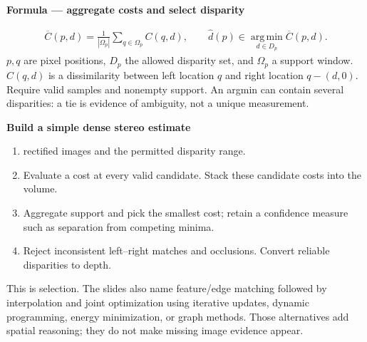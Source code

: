 \documentclass[letterpaper,11pt,english,openany,oneside]{jupyterBook}
\begin{document}
\ignorespaces
{}\ignorespaces
{}\ignorespaces
\begin{TextbookBox}
\textbf{Formula — aggregate costs and select disparity}\par\smallskip
\begin{equation}\label{equation:lectures/lecture04/matching:eq-lec04-cost-volume}
\begin{split}\overline C(p,d)=\frac1{|\Omega_p|}\sum_{q\in\Omega_p}C(q,d),
\qquad \widehat d(p)\in\operatorname*{arg\,min}_{d\in D_p}\overline C(p,d).\end{split}
\end{equation}
\sphinxAtStartPar
\(p,q\) are pixel positions, \(D_p\) the allowed disparity set, and \(\Omega_p\) a support window. \(C(q,d)\) is a dissimilarity between left location \(q\) and right location \(q-(d,0)\). Require valid samples and nonempty support. An argmin can contain several disparities: a tie is evidence of ambiguity, not a unique measurement.

\end{TextbookBox}

\begin{TextbookBox}
\textbf{Build a simple dense stereo estimate}\par\smallskip
\begin{enumerate}
%
\item {}
\sphinxAtStartPar
{} rectified images and the permitted disparity range.

\item {}
\sphinxAtStartPar
Evaluate a cost at every valid candidate. Stack these candidate costs into the volume.

\item {}
\sphinxAtStartPar
Aggregate support and pick the smallest cost; retain a confidence measure such as separation from competing minima.

\item {}
\sphinxAtStartPar
Reject inconsistent left–right matches and occlusions. Convert reliable disparities to depth.

\end{enumerate}

\sphinxAtStartPar
This is  selection. The slides also name feature/edge matching followed by interpolation and joint optimization using iterative updates, dynamic programming, energy minimization, or graph methods. Those alternatives add spatial reasoning; they do not make missing image evidence appear.

\end{TextbookBox}
\end{document}
